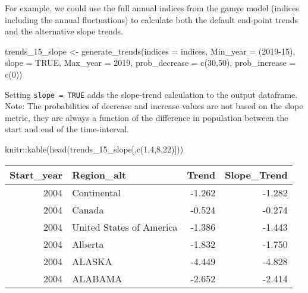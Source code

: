 \documentclass[
]{book}
\newenvironment{Shaded}{\begin{snugshade}}{\end{snugshade}}
\newcommand{\AttributeTok}[1]{\textcolor[rgb]{0.77,0.63,0.00}{#1}}
\newcommand{\ConstantTok}[1]{\textcolor[rgb]{0.00,0.00,0.00}{#1}}
\newcommand{\DecValTok}[1]{\textcolor[rgb]{0.00,0.00,0.81}{#1}}
\newcommand{\FunctionTok}[1]{\textcolor[rgb]{0.00,0.00,0.00}{#1}}
\newcommand{\NormalTok}[1]{#1}
\newcommand{\OtherTok}[1]{\textcolor[rgb]{0.56,0.35,0.01}{#1}}
\newcommand{\SpecialCharTok}[1]{\textcolor[rgb]{0.00,0.00,0.00}{#1}}
\begin{document}
For example, we could use the full annual indices from the gamye model (indices including the annual fluctuations) to calculate both the default end-point trends and the alternative slope trends.

\begin{Shaded}
\begin{Highlighting}[]
\NormalTok{trends\_15\_slope }\OtherTok{\textless{}{-}} \FunctionTok{generate\_trends}\NormalTok{(}\AttributeTok{indices =}\NormalTok{ indices,}
                          \AttributeTok{Min\_year =}\NormalTok{ (}\DecValTok{2019{-}15}\NormalTok{),}
                          \AttributeTok{slope =} \ConstantTok{TRUE}\NormalTok{,}
                          \AttributeTok{Max\_year =} \DecValTok{2019}\NormalTok{,}
                          \AttributeTok{prob\_decrease =} \FunctionTok{c}\NormalTok{(}\DecValTok{30}\NormalTok{,}\DecValTok{50}\NormalTok{),}
                          \AttributeTok{prob\_increase =} \FunctionTok{c}\NormalTok{(}\DecValTok{0}\NormalTok{))}
\end{Highlighting}
\end{Shaded}

Setting \texttt{slope\ =\ TRUE} adds the slope-trend calculation to the output dataframe. Note: The probabilities of decrease and increase values are not based on the slope metric, they are always a function of the difference in population between the start and end of the time-interval.

\begin{Shaded}
\begin{Highlighting}[]
\NormalTok{knitr}\SpecialCharTok{::}\FunctionTok{kable}\NormalTok{(}\FunctionTok{head}\NormalTok{(trends\_15\_slope[,}\FunctionTok{c}\NormalTok{(}\DecValTok{1}\NormalTok{,}\DecValTok{4}\NormalTok{,}\DecValTok{8}\NormalTok{,}\DecValTok{22}\NormalTok{)]))}
\end{Highlighting}
\end{Shaded}

\begin{tabular}{r|l|r|r}
\hline
Start\_year & Region\_alt & Trend & Slope\_Trend\\
\hline
2004 & Continental & -1.262 & -1.282\\
\hline
2004 & Canada & -0.524 & -0.274\\
\hline
2004 & United States of America & -1.386 & -1.443\\
\hline
2004 & Alberta & -1.832 & -1.750\\
\hline
2004 & ALASKA & -4.449 & -4.828\\
\hline
2004 & ALABAMA & -2.652 & -2.414\\
\hline
\end{tabular}
\end{document}

